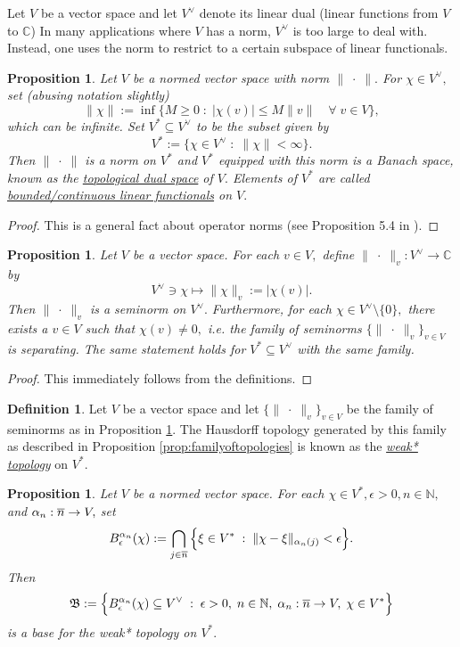 \documentclass[12pt]{article}
\theoremstyle{theorem}
\newtheorem{proposition}[equation]{Proposition}
\theoremstyle{definition}
\newtheorem{definition}[equation]{Definition}
\numberwithin{equation}{section}
\let\a=\alpha \let\b=\beta \let\g=\gamma \let\de=\delta \let\e=\epsilon
\let\C=\Chi \let\W=\Omega
\newcommand{\be}{\begin{equation}}
\newcommand{\ee}{\end{equation}}
\newcommand{\bn}{\begin{proposition}}
\newcommand{\en}{\end{proposition}}
\newcommand{\bd}{\begin{definition}}
\newcommand{\ed}{\end{definition}}
\newcommand{\bprf}{\begin{proof}}
\newcommand{\eprf}{\end{proof}}
\newcommand{\<}{\langle}
\renewcommand{\>}{\rangle}
\def\C{{{\mathbb C}}}
\def\N{{{\mathbb N}}}
\begin{document}
Let $V$ be a vector space and let $V^{\vee}$ denote its linear dual
(linear functions from $V$ to $\C$)
In many applications where $V$ has a norm, 
$V^{\vee}$ is too large to deal with. Instead, one uses the norm
to restrict to a certain subspace of linear functionals. 

\bn
\label{prop:topologicaldual}
Let $V$ be a normed vector space with norm $\lVert\;\cdot\;\rVert.$
For $\chi\in V^{\vee},$ set (abusing notation slightly)
\be
\lVert\chi\rVert:=\inf\Big\{M\ge0\;:\;\big|\chi(v)\big|\le M\lVert v\rVert\quad\forall\;v\in V\Big\}, 
\ee 
which can be infinite. 
Set $V^*\subseteq V^{\vee}$ to be the subset given by 
\be
V^*:=\big\{\chi\in V^{\vee}\;:\;\lVert\chi\rVert<\infty\big\}. 
\ee
Then $\lVert\;\cdot\;\rVert$ is a norm on $V^*$ and $V^*$ equipped with 
this norm is a Banach space, known
as the \emph{\uline{topological dual space}} of $V.$ 
Elements of $V^*$ are called 
\emph{\uline{bounded/continuous linear functionals}} on $V.$ 
\en

\bprf
This is a general fact about operator norms (see Proposition 5.4 in \cite{Fo07}). 
\eprf

\bn
\label{prop:seminormsondualfromoriginal}
Let $V$ be a vector space. For each $v\in V,$ define 
$\lVert\;\cdot\;\rVert_{v}:V^{\vee}\to\C$ by
\be
V^{\vee}\ni\chi\mapsto\lVert\chi\rVert_{v} :=|\chi(v)|.
\ee
Then $\lVert\;\cdot\;\rVert_{v}$ is a seminorm on $V^{\vee}.$ 
Furthermore, for each $\chi\in V^{\vee}\setminus\{0\},$ there exists a $v\in V$
such that $\chi(v)\ne0,$ i.e. the family of seminorms 
$\{\lVert\;\cdot\;\rVert_{v}\}_{v\in V}$ is separating. 
The same statement holds for $V^*\subseteq V^{\vee}$ with the same family.
\en

\bprf
This immediately follows from the definitions. 
\eprf

\bd
Let $V$ be a vector space and let 
$\{\lVert\;\cdot\;\rVert_{v}\}_{v\in V}$ be the family
of seminorms as in Proposition \ref{prop:seminormsondualfromoriginal}.
The Hausdorff topology generated by this family
as described in Proposition \ref{prop:familyoftopologies}
is known as the \emph{\uline{weak* topology}} on $V^{*}.$
\ed

\bn
\label{prop:weakstartopologybase}
Let $V$ be a normed vector space.
For each $\chi\in V^{*}, \e>0, n\in\N,$ and
$\a_{n}:\ov n\to V,$ set
\be
B_{\e}^{\a_{n}}(\chi)%
:=\bigcap_{j\in\ov n}\Big\{\xi\in V^{*} \;:\;
\lVert\chi-\xi\rVert_{\a_{n}(j)}<\e\Big\}.
\ee
Then 
\be
\mathfrak{B}:=\Big\{ B_{\e}^{\a_{n}}(\chi)\subseteq V^{\vee} \;:\;
\e>0,\;n\in\N,\;\a_{n}:\ov n\to V,\;\chi\in V^{*}\Big\}
\ee
is a base for the weak* topology on $V^{*}.$
\en
\end{document}
